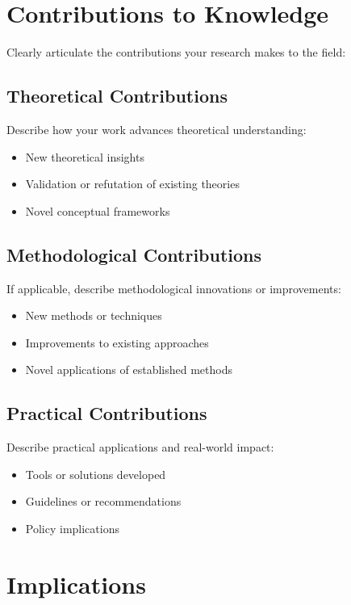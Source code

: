 \section{Contributions to Knowledge}

Clearly articulate the contributions your research makes to the field:

\subsection{Theoretical Contributions}

Describe how your work advances theoretical understanding:

\begin{itemize}
    \item New theoretical insights
    \item Validation or refutation of existing theories
    \item Novel conceptual frameworks
\end{itemize}

\subsection{Methodological Contributions}

If applicable, describe methodological innovations or improvements:

\begin{itemize}
    \item New methods or techniques
    \item Improvements to existing approaches
    \item Novel applications of established methods
\end{itemize}

\subsection{Practical Contributions}

Describe practical applications and real-world impact:

\begin{itemize}
    \item Tools or solutions developed
    \item Guidelines or recommendations
    \item Policy implications
\end{itemize}

\section{Implications}

